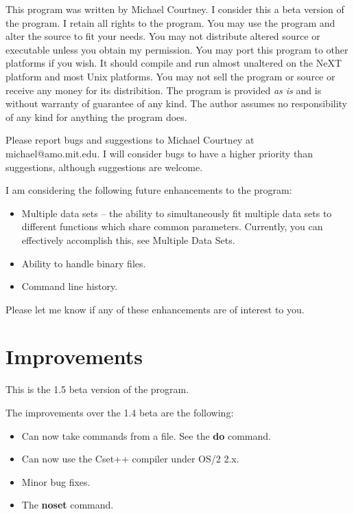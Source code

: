  This program was written by Michael Courtney.  I consider 
 this a beta version of the program.  I retain all rights 
 to the program. You may use the program and alter the 
 source to fit your needs. You may not distribute altered 
 source or executable unless you obtain my permission.  You 
 may port this program to other platforms if you wish.  It 
 should compile and run almost unaltered on the NeXT 
 platform and most Unix platforms.  You may not sell the 
 program or source or receive any money for its 
 distribition.  The program is provided {\em as is} and is 
 without warranty of guarantee of any kind.  The author 
 assumes no responsibility of any kind for anything the 
 program does.

 Please report bugs and suggestions to Michael Courtney
 at michael@amo.mit.edu.  I will consider bugs to have
 a higher priority than suggestions, although suggestions 
 are welcome.

 I am considering the following future enhancements to the
 program:

\begin{itemize}
\item Multiple data sets -- the ability to simultaneously fit 
 multiple data sets to different functions which share 
 common parameters.  Currently, you can effectively 
 accomplish this, see Multiple Data Sets.
 
\item Ability to handle binary files.

\item  Command line history.

\end{itemize}

  Please let me know if any of these enhancements are of 
 interest to you.

\section{Improvements}

 This is the 1.5 beta version of the program.

 The improvements over the 1.4 beta are the following:

\begin{itemize}
\item Can now take commands from a file.  See the {\bf do} command.
\item Can now use the Cset++ compiler under OS/2 2.x.
\item Minor bug fixes.
\item The {\bf noset} command.
\end{itemize}


